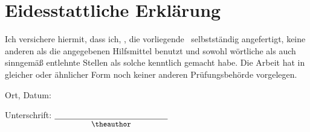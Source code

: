 \chapter*{Eidesstattliche Erklärung}

Ich versichere hiermit, dass ich, \theauthor, die vorliegende \thethesis\ selbstständig angefertigt, keine anderen als die angegebenen Hilfsmittel benutzt und sowohl wörtliche als auch sinngemäß entlehnte Stellen als solche kenntlich gemacht habe. Die Arbeit hat in gleicher oder ähnlicher Form noch keiner anderen Prüfungsbehörde vorgelegen.

\bigskip\bigskip\bigskip
\noindent Ort, Datum: \underline{\hphantom{01.01.2020, Lüdenscheidt-West}}

\bigskip\bigskip\bigskip
\noindent Unterschrift: $\underset{\text{\small\theauthor}}{\underline{\hphantom{\text{01.01.2020, Lüdenscheidt-West}}}}$